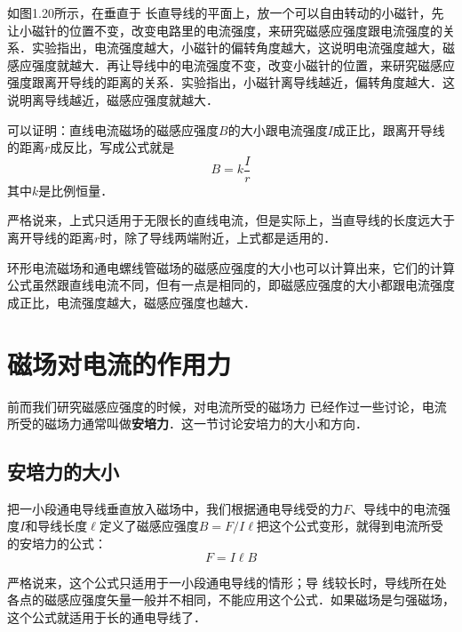 如图1.20所示，在垂直于
长直导线的平面上，放一个可以自由转动的小磁针，先让小磁针的位置不变，改变电路里的电流强度，来研究磁感应强度跟电流强度的关系．实验指出，电流强度越大，小磁针的偏转角度越大，这说明电流强度越大，磁感应强度就越大．再让导线中的电流强度不变，改变小磁针的位置，来研究磁感应强度跟离开导线的距离的关系．实验指出，小磁针离导线越近，偏转角度越大．这说明离导线越近，磁感应强度就越大．

可以证明：直线电流磁场的磁感应强度$B$的大小跟电流强度$I$成正比，跟离开导线的距离$r$成反比，写成公式就是
\[B=k\frac{I}{r}\]
其中$k$是比例恒量．

严格说来，上式只适用于无限长的直线电流，但是实际上，当直导线的长度远大于离开导线的距离$r$时，除了导线两端附近，上式都是适用的．

环形电流磁场和通电螺线管磁场的磁感应强度的大小也可以计算出来，它们的计算公式虽然跟直线电流不同，但有一点是相同的，即磁感应强度的大小都跟电流强度成正比，电流强度越大，磁感应强度也越大．

\section{磁场对电流的作用力}
前而我们研究磁感应强度的时候，对电流所受的磁场力
已经作过一些讨论，电流所受的磁场力通常叫做\textbf{安培力}．这一节讨论安培力的大小和方向．

\subsection{安培力的大小}

把一小段通电导线垂直放入磁场中，我们根据通电导线受的力$F$、导线中的电流强度$I$和导线长度$\ell$定义了磁感应强度$B=F/I\ell$把这个公式变形，就得到电流所受的安培力的公式：
\[F=I\ell B\]

严格说来，这个公式只适用于一小段通电导线的情形；导
线较长时，导线所在处各点的磁感应强度矢量一般并不相同，不能应用这个公式．如果磁场是匀强磁场，这个公式就适用于长的通电导线了．
\begin{figure}[htp]\centering
{}
	\caption{ }
\end{figure}

